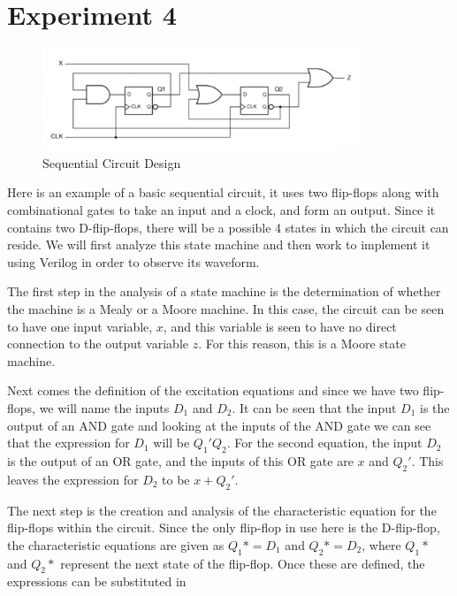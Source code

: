 \documentclass[12pt]{article}
\begin{document}
    \section*{Experiment 4}
    \begin{figure}[h]
        \centering
        \includegraphics[width=0.85\textwidth]{Sequential Circuit Design.png}
        \caption{Sequential Circuit Design}
    \end{figure}
    \par Here is an example of a basic sequential circuit, it uses two
    flip-flops along with combinational gates to take an input and a clock, and
    form an output. Since it contains two D-flip-flops, there will be a possible
    4 states in which the circuit can reside. We will first analyze this state
    machine and then work to implement it using Verilog in order to observe its
    waveform.
    \par The first step in the analysis of a state machine is the determination
    of whether the machine is a Mealy or a Moore machine. In this case, the
    circuit can be seen to have one input variable, $x$, and this variable is
    seen to have no direct connection to the output variable $z$. For this
    reason, this is a Moore state machine.
    \par Next comes the definition of the excitation equations and since we have
    two flip-flops, we will name the inputs $D_1$ and $D_2$. It can be seen that
    the input $D_1$ is the output of an AND gate and looking at the inputs of
    the AND gate we can see that the expression for $D_1$ will be $Q_1' Q_2$.
    For the second equation, the input $D_2$ is the output of an OR gate, and
    the inputs of this OR gate are $x$ and $Q_2'$. This leaves the expression
    for $D_2$ to be $x+Q_2'$.
    \par The next step is the creation and analysis of the characteristic
    equation for the flip-flops within the circuit. Since the only flip-flop in
    use here is the D-flip-flop, the characteristic equations are given as $Q_1*
    = D_1$ and $Q_2* = D_2$, where $Q_1*$ and $Q_2*$ represent the next state of
    the flip-flop. Once these are defined, the expressions can be substituted in
\end{document}
